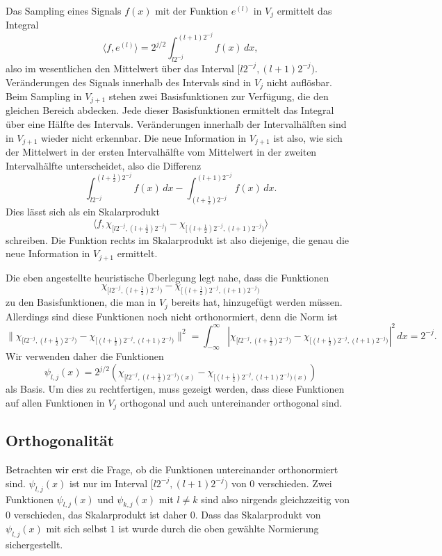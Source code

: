 Das Sampling eines Signals $f(x)$ mit der Funktion $e^{(l)}$ in $V_j$
ermittelt das Integral
\[
\langle f,e^{(l)}\rangle
=
2^{j/2}
\int_{l2^{-j}}^{(l+1)2^{-j}} f(x)\,dx,
\]
also im wesentlichen den Mittelwert über das Interval $[l2^{-j},(l+1)2^{-j})$.
Veränderungen des Signals innerhalb des Intervals sind in $V_j$ nicht
auflösbar.
Beim Sampling in $V_{j+1}$ stehen zwei Basisfunktionen zur Verfügung, die
den gleichen Bereich abdecken.
Jede dieser Basisfunktionen ermittelt das Integral über eine Hälfte des
Intervals.
Veränderungen innerhalb der Intervalhälften sind in $V_{j+1}$ wieder nicht
erkennbar.
Die neue Information in $V_{j+1}$ ist also, wie sich der Mittelwert
in der ersten Intervalhälfte vom Mittelwert in der zweiten Intervalhälfte
unterscheidet, also die Differenz
\[
\int_{l2^{-j}}^{(l+\frac12)2^{-j}} f(x)\,dx
-
\int_{(l+\frac12)2^{-j}}^{(l+1)2^{-j}} f(x)\,dx.
\]
Dies lässt sich als ein Skalarprodukt
\[
\langle f,
\chi_{[l2^{-j},(l+\frac12)2^{-j})}
-
\chi_{[(l+\frac12)2^{-j},(l+1)2^{-j})}
\rangle
\]
schreiben.
Die Funktion rechts im Skalarprodukt ist also diejenige, die genau die
neue Information in $V_{j+1}$ ermittelt.

Die eben angestellte heuristische Überlegung legt nahe, dass die Funktionen
\begin{equation}
\chi_{[l2^{-j},(l+\frac12)2^{-j})}
-
\chi_{[(l+\frac12)2^{-j},(l+1)2^{-j})}
\end{equation}
zu den Basisfunktionen, die man in $V_j$ bereits hat, hinzugefügt werden
müssen.
Allerdings sind diese Funktionen noch nicht orthonormiert, denn die
Norm ist
\[
\|
\chi_{[l2^{-j},(l+\frac12)2^{-j})}
-
\chi_{[(l+\frac12)2^{-j},(l+1)2^{-j})}
\|^2
=
\int_{-\infty}^\infty
|
\chi_{[l2^{-j},(l+\frac12)2^{-j})}
-
\chi_{[(l+\frac12)2^{-j},(l+1)2^{-j})}
|^2
\,dx
=
2^{-j}.
\]
Wir verwenden daher die Funktionen
\[
\psi_{l,j}(x) = 2^{j/2}(
\chi_{[l2^{-j},(l+\frac12)2^{-j})(x)}
-
\chi_{[(l+\frac12)2^{-j},(l+1)2^{-j})(x)}
)
\]
als Basis.
Um dies zu rechtfertigen, muss gezeigt werden, dass diese Funktionen auf
allen Funktionen in $V_j$ orthogonal und auch untereinander orthogonal
sind.

\subsection{Orthogonalität}
Betrachten wir erst die Frage, ob die Funktionen untereinander orthonormiert
sind.
$\psi_{l,j}(x)$ ist nur im Interval $[l2^{-j},(l+1)2^{-j})$ von $0$
verschieden.
Zwei Funktionen $\psi_{l,j}(x)$ und $\psi_{k,j}(x)$ mit $l\ne k$ sind
also nirgends gleichzzeitig von $0$ verschieden, das Skalarprodukt ist
daher $0$.
Dass das Skalarprodukt von $\psi_{l,j}(x)$ mit sich selbst $1$ ist wurde
durch die oben gewählte Normierung sichergestellt.

